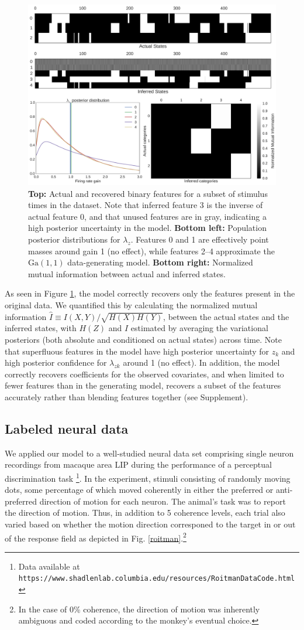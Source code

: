 \documentclass{article} %
\begin{document}
\begin{figure}[ht]
    \center
    \includegraphics[width=0.6\linewidth]{figures/synthetic}
    \caption{\textbf{Top:} Actual and recovered binary features for a subset of stimulus times in the dataset. Note that inferred feature 3 is the inverse of actual feature 0, and that unused features are in gray, indicating a high posterior uncertainty in the model. \textbf{Bottom left:} Population posterior distributions for $\lambda_z$. Features 0 and 1 are effectively point masses around gain 1 (no effect), while features 2--4 approximate the $\text{Ga}(1, 1)$ data-generating model. \textbf{Bottom right:} Normalized mutual information between actual and inferred states.}
    \label{synthetic}
\end{figure}

As seen in Figure \ref{synthetic}, the model correctly recovers only the features present in the original data. We quantified this by calculating the normalized mutual information $\hat{I}\equiv I(X, Y)/\sqrt{H(X)H(Y)}$, between the actual states and the inferred states, with $H(Z)$ and $I$ estimated by averaging the variational posteriors (both absolute and conditioned on actual states) across time. Note that superfluous features in the model have high posterior uncertainty for $z_k$ and high posterior confidence for $\lambda_{zk}$ around 1 (no effect). In addition, the model correctly recovers coefficients for the observed covariates, and when limited to fewer features than in the generating model, recovers a subset of the features accurately rather than blending features together (see Supplement).

\subsection{Labeled neural data}
We applied our model to a well-studied neural data set comprising single neuron recordings from macaque area LIP during the performance of a perceptual discrimination task \cite{roitman2002response}\footnote{Data available at \texttt{https://www.shadlenlab.columbia.edu/resources/RoitmanDataCode.html}}. In the experiment, stimuli consisting of randomly moving dots, some percentage of which moved coherently in either the preferred or anti-preferred direction of motion for each neuron. The animal's task was to report the direction of motion. Thus, in addition to 5 coherence levels, each trial also varied based on whether the motion direction corresponed to the target in or out of the response field as depicted in Fig. \ref{roitman}.\footnote{In the case of 0\% coherence, the direction of motion was inherently ambiguous and coded according to the monkey's eventual choice.}
\end{document}
